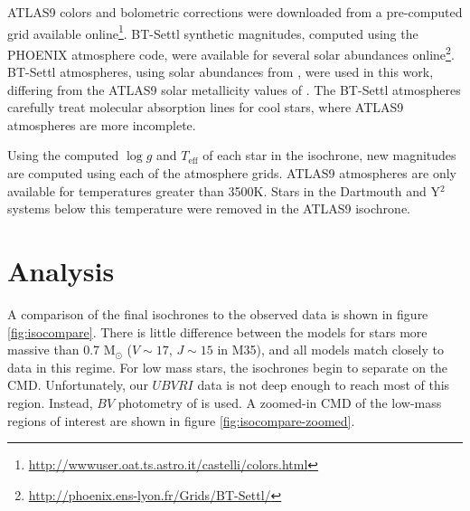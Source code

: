 \documentclass[iop]{emulateapj}
\begin{document}
ATLAS9 colors and bolometric corrections were downloaded from a pre-computed grid available online\footnote{\url{http://wwwuser.oat.ts.astro.it/castelli/colors.html}}. BT-Settl synthetic magnitudes, computed using the PHOENIX atmosphere code, were available for several solar abundances online\footnote{\url{http://phoenix.ens-lyon.fr/Grids/BT-Settl/}}. BT-Settl atmospheres, using solar abundances from \citet{2009ARA&A..47..481A}, were used in this work, differing from the ATLAS9 solar metallicity values of \citet{1998SSRv...85..161G}. The BT-Settl atmospheres carefully treat molecular absorption lines for cool stars, where ATLAS9 atmospheres are more incomplete.

Using the computed $\log g$ and $T_{\text{eff}}$ of each star in the isochrone, new magnitudes are computed using each of the atmosphere grids. ATLAS9 atmospheres are only available for temperatures greater than 3500K. Stars in the Dartmouth and Y$^2$ systems below this temperature were removed in the ATLAS9 isochrone.




\section{Analysis}

A comparison of the final isochrones to the observed data is shown in figure \ref{fig:isocompare}. There is little difference between the models for stars more massive than 0.7 M$_\odot$ ($V \sim 17$, $J \sim 15$ in M35), and all models match closely to data in this regime. For low mass stars, the isochrones begin to separate on the CMD. Unfortunately, our $UBVRI$ data is not deep enough to reach most of this region. Instead, $BV$ photometry of \citet{2003AJ....126.1402K} is used. A zoomed-in CMD of the low-mass regions of interest are shown in figure \ref{fig:isocompare-zoomed}.
\end{document}
